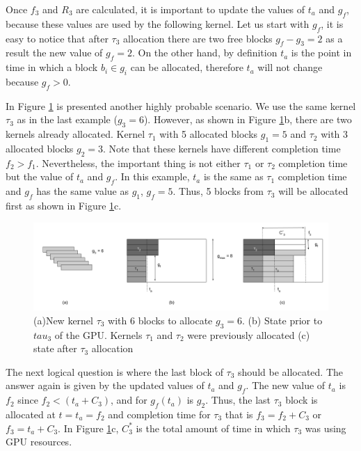 \documentclass[
  12pt,
  a4paperpaper,
]{report}
\begin{document}
Once \(f_3\) and \(R_3\) are calculated, it is important to update the
values of \(t_a\) and \(g_f\), because these values are used by the
following kernel. Let us start with \(g_f\), it is easy to notice that
after \(\tau_3\) allocation there are two free blocks \(g_f - g_3 = 2\) as a
result the new value of \(g_f = 2\). On the other hand, by definition
\(t_a\) is the point in time in which a block \(b_i \in g_i\) can be
allocated, therefore \(t_a\) will not change because \(g_f > 0\).

In Figure \ref{img:new_kernel_2} is presented another highly probable
scenario. We use the same kernel \(\tau_3\) as in the last example
(\(g_3 = 6\)). However, as shown in Figure \ref{img:new_kernel_2}b,
there are two kernels already  allocated. Kernel \(\tau_1\) with 5
allocated blocks \(g_1 = 5\) and \(\tau_2\) with 3 allocated blocks \(g_2 = 3\).
Note that these kernels have different completion time \(f_2 > f_1\).
Nevertheless, the important thing is not either \(\tau_1\) or \(\tau_2\) completion time but
the value of \(t_a\) and \(g_f\). In this example, \(t_a\) is the same
as \(\tau_1\) completion time and \(g_f\) has the same value as \(g_1\),
\(g_f = 5\). Thus, 5 blocks from \(\tau_3\) will be allocated first as shown in
Figure \ref{img:new_kernel_2}c.~

\begin{figure}
\centering
\includegraphics{source/figures/new_kernel_2.png}
\caption{(a)New kernel \(\tau_3\) with 6 blocks to allocate \(g_3 = 6\). (b)
State prior to \(tau_3\) of the GPU. Kernels \(\tau_1\) and \(\tau_2\) were previously
allocated (c) state after \(\tau_3\) allocation \label{img:new_kernel_2}}
\end{figure}

The next logical question is where the last block of \(\tau_3\) should be
allocated. The answer again is given by the updated values of \(t_a\)
and \(g_f\). 
The new value of \(t_a\) is \(f_2\) since \(f_2 <( t_a + C_3 )\), and for  \(g_f(t_a)\) is \(g_2\). 
Thus, the last \(\tau_3\) block is allocated at \(t=t_a=f_2\) and  completion time for \(\tau_3\) that is \(f_3 = f_2+C_3\) or \(f_3 = t_a + C_3\).
In Figure \ref{img:new_kernel_2}c,  \(C^{*}_3\) is the total amount of time in which \(\tau_3\) was using GPU resources.
\end{document}
